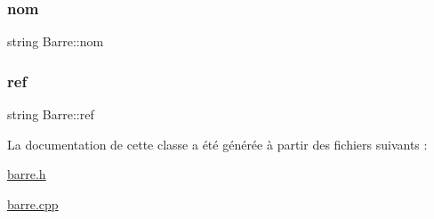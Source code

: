 \mbox{\label{class_barre_a28ab665131a097ea05e175e461375362}} 
\subsubsection{\texorpdfstring{nom}{nom}}
{\footnotesize\ttfamily string Barre\+::nom\hspace{0.3cm}{\ttfamily [protected]}}

\mbox{\label{class_barre_adc8a65b186d431c2c81f434d3d6973b1}} 
\subsubsection{\texorpdfstring{ref}{ref}}
{\footnotesize\ttfamily string Barre\+::ref\hspace{0.3cm}{\ttfamily [protected]}}



La documentation de cette classe a été générée à partir des fichiers suivants \+:\begin{DoxyCompactItemize}
\item 
\hyperlink{barre_8h}{barre.\+h}\item 
\hyperlink{barre_8cpp}{barre.\+cpp}\end{DoxyCompactItemize}
